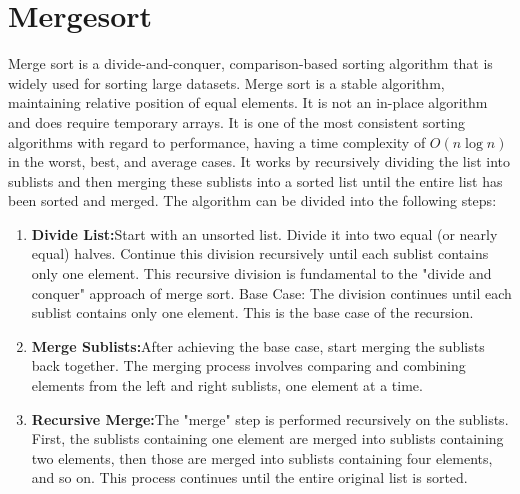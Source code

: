 \documentclass[12pt]{amsart}
\begin{document}
\section{Mergesort}
Merge sort is a divide-and-conquer, comparison-based sorting algorithm that is widely 
used for sorting large datasets. Merge sort is a stable algorithm, maintaining relative 
position of equal elements. It is not an in-place algorithm and does require temporary 
arrays. It is one of the most consistent sorting algorithms with regard to performance, 
having a time complexity of $O(n \log n)$ in the worst, best, and average cases. It works 
by recursively dividing the list into sublists and then merging these sublists into a 
sorted list until the entire list has been sorted and merged.
\newline
\newline
The algorithm can be divided into the following steps:
\begin{enumerate}
    \item \textbf{Divide List:}Start with an unsorted list. Divide it into two equal 
                        (or nearly equal) halves. Continue this division recursively 
                        until each sublist contains only one element. This recursive 
                        division is fundamental to the "divide and conquer" approach 
                        of merge sort. Base Case: The division continues until each 
                        sublist contains only one element. This is the base case of 
                        the recursion.
    \item \textbf{Merge Sublists:}After achieving the base case, start merging the 
                        sublists back together. The merging process involves comparing 
                        and combining elements from the left and right sublists, one 
                        element at a time. 
    \item \textbf{Recursive Merge:}The "merge" step is performed recursively on the 
                        sublists. First, the sublists containing one element are merged 
                        into sublists containing two elements, then those are merged 
                        into sublists containing four elements, and so on. This process 
                        continues until the entire original list is sorted.
\end{enumerate}
\end{document}
